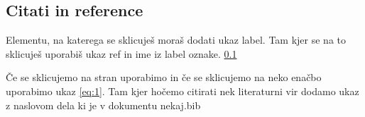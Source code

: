 \documentclass[a4paper, 10pt]{article}
\begin{document}
\printindex


\subsection{Citati in reference}
\label{sec:citati}

Elementu, na katerega se sklicuješ moraš dodati ukaz label. Tam kjer se na to sklicuješ uporabiš ukaz ref in ime iz label oznake.
\ref{sec:citati}

Če se sklicujemo na stran uporabimo \pageref{sec:matematika} in če se sklicujemo na neko enačbo uporabimo ukaz \eqref{eq:1}.
Tam kjer hočemo citirati nek literaturni vir dodamo ukaz \cite{Tarski55} z naslovom dela ki je v dokumentu nekaj.bib



\end{document}
